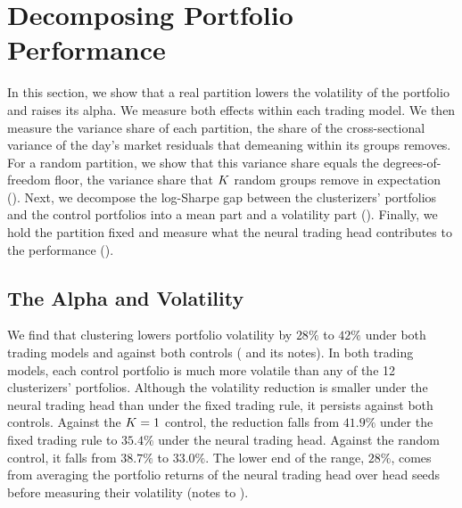\section{Decomposing Portfolio Performance}
\label{sec:riskreturn}

In this section, we show that a real partition lowers the volatility of the portfolio and raises its alpha. We measure both effects within each trading model. We then measure the variance share of each partition, the share of the cross-sectional variance of the day's market residuals that demeaning within its groups removes. For a random partition, we show that this variance share equals the degrees-of-freedom floor, the variance share that $K$ random groups remove in expectation (). Next, we decompose the log-Sharpe gap between the clusterizers' portfolios and the control portfolios into a mean part and a volatility part (). Finally, we hold the partition fixed and measure what the neural trading head contributes to the performance ().



\subsection{The Alpha and Volatility}
\label{sec:hedge}

We find that clustering lowers portfolio volatility by $28\%$ to $42\%$ under both trading models and against both controls ( and its notes). In both trading models, each control portfolio is much more volatile than any of the 12 clusterizers' portfolios. Although the volatility reduction is smaller under the neural trading head than under the fixed trading rule, it persists against both controls. Against the $K=1$ control, the reduction falls from $41.9\%$ under the fixed trading rule to $35.4\%$ under the neural trading head. Against the random control, it falls from $38.7\%$ to $33.0\%$. The lower end of the range, $28\%$, comes from averaging the portfolio returns of the neural trading head over head seeds before measuring their volatility (notes to ).

